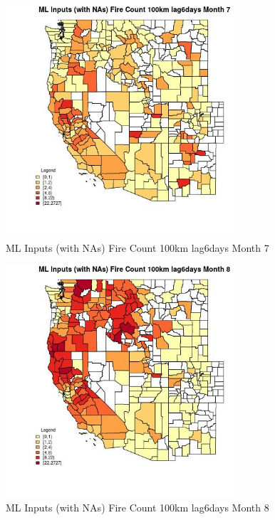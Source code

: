 \begin{figure} 
\centering  
\includegraphics[width=0.77\textwidth]{Code_Outputs/Report_ML_input_PM25_Step4_part_f_de_duplicated_aveswNAs_CountyFire_Count_100km_lag6daysmedianMonth7.jpg} 
\caption{\label{fig:Report_ML_input_PM25_Step4_part_f_de_duplicated_aveswNAsCountyFire_Count_100km_lag6daysmedianMonth7}ML Inputs (with NAs) Fire Count 100km lag6days Month 7} 
\end{figure} 
 

\begin{figure} 
\centering  
\includegraphics[width=0.77\textwidth]{Code_Outputs/Report_ML_input_PM25_Step4_part_f_de_duplicated_aveswNAs_CountyFire_Count_100km_lag6daysmedianMonth8.jpg} 
\caption{\label{fig:Report_ML_input_PM25_Step4_part_f_de_duplicated_aveswNAsCountyFire_Count_100km_lag6daysmedianMonth8}ML Inputs (with NAs) Fire Count 100km lag6days Month 8} 
\end{figure} 
 

